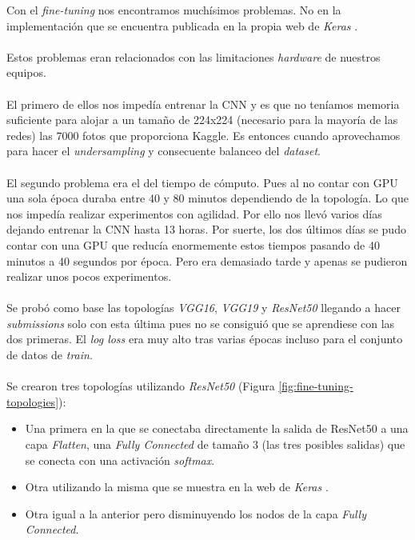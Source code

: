 Con el \textit{fine-tuning} nos encontramos muchísimos problemas. No en la implementación que se encuentra publicada en la propia web de \textit{Keras} \cite{KerasApplications}.
\\ \\
Estos problemas eran relacionados con las limitaciones \textit{hardware} de nuestros equipos.
\\ \\
El primero de ellos nos impedía entrenar la CNN y es que no teníamos memoria suficiente para alojar a un tamaño de 224x224 (necesario para la mayoría de las redes) las 7000 fotos que proporciona Kaggle. Es entonces cuando aprovechamos para hacer el \textit{undersampling} y consecuente balanceo del \textit{dataset}.
\\ \\
El segundo problema era el del tiempo de cómputo. Pues al no contar con GPU una sola época duraba entre 40 y 80 minutos dependiendo de la topología. Lo que nos impedía realizar experimentos con agilidad. Por ello nos llevó varios días dejando entrenar la CNN hasta 13 horas. Por suerte, los dos últimos días se pudo contar con una GPU que reducía enormemente estos tiempos pasando de 40 minutos a 40 segundos por época. Pero era demasiado tarde y apenas se pudieron realizar unos pocos experimentos.
\\ \\
Se probó como base las topologías \textit{VGG16}, \textit{VGG19} y \textit{ResNet50} llegando a hacer \textit{submissions} solo con esta última pues no se consiguió que se aprendiese con las dos primeras. El \textit{log loss} era muy alto tras varias épocas incluso para el conjunto de datos de \textit{train}.
\\ \\
Se crearon tres topologías utilizando \textit{ResNet50} (Figura \ref{fig:fine-tuning-topologies}):

\begin{itemize}
	\item Una primera en la que se conectaba directamente la salida de ResNet50 a una capa \textit{Flatten}, una \textit{Fully Connected} de tamaño 3 (las tres posibles salidas) que se conecta con una activación \textit{softmax}.
	\item Otra utilizando la misma que se muestra en la web de \textit{Keras} \cite{KerasApplications}.
	\item Otra igual a la anterior pero disminuyendo los nodos de la capa \textit{Fully Connected}.
\end{itemize}

